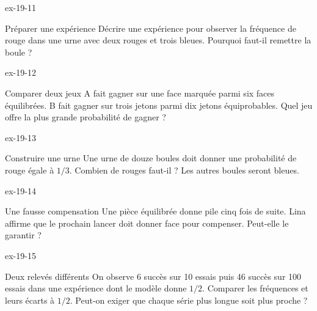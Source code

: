\begin{blocLivre}{ex-19-11}\begin{exercice}[3]{Préparer une expérience}
Décrire une expérience pour observer la fréquence de rouge dans une urne avec deux rouges et trois bleues. Pourquoi faut-il remettre la boule ?
\label{fig-ex-19-11}
\end{exercice}\end{blocLivre}
\begin{blocLivre}{ex-19-12}\begin{exercice}[3]{Comparer deux jeux}
A fait gagner sur une face marquée parmi six faces équilibrées. B fait gagner sur trois jetons parmi dix jetons équiprobables. Quel jeu offre la plus grande probabilité de gagner ?
\end{exercice}\end{blocLivre}
\begin{blocLivre}{ex-19-13}\begin{exercice}[3]{Construire une urne}
Une urne de douze boules doit donner une probabilité de rouge égale à $1/3$. Combien de rouges faut-il ? Les autres boules seront bleues.
\label{fig-ex-19-13}
\end{exercice}\end{blocLivre}
\begin{blocLivre}{ex-19-14}\begin{exercice}[3]{Une fausse compensation}
Une pièce équilibrée donne pile cinq fois de suite. Lina affirme que le prochain lancer doit donner face pour compenser. Peut-elle le garantir ?
\end{exercice}\end{blocLivre}
\begin{blocLivre}{ex-19-15}\begin{exercice}[3]{Deux relevés différents}
On observe 6 succès sur 10 essais puis 46 succès sur 100 essais dans une expérience dont le modèle donne $1/2$. Comparer les fréquences et leurs écarts à $1/2$. Peut-on exiger que chaque série plus longue soit plus proche ?
\end{exercice}\end{blocLivre}

\clearpage
